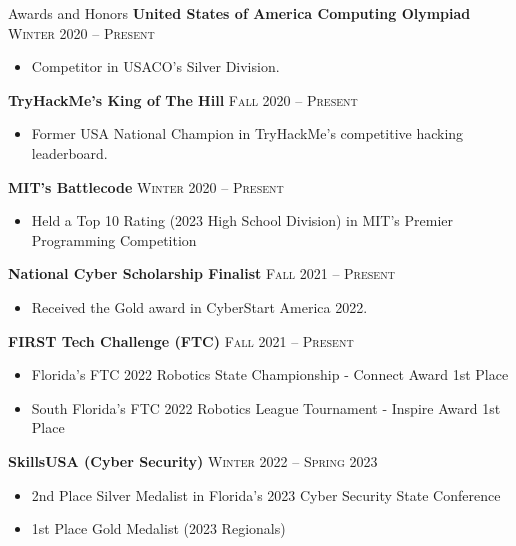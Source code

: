 \begin{resume_section}{Awards and Honors}
	\textbf{United States of America Computing Olympiad} \hspace*{\fill} \textsc{Winter 2020 -- Present}

	\begin{itemize}
		\setlength{\labelsep}{0.1in}
		\item Competitor in USACO’s Silver Division.
	\end{itemize}

	\textbf{TryHackMe's King of The Hill} \hspace*{\fill} \textsc{Fall 2020 -- Present}

	\begin{itemize}
		\setlength{\labelsep}{0.1in}
		\item Former USA National Champion in TryHackMe’s competitive hacking leaderboard.
	\end{itemize}

	\textbf{MIT's Battlecode} \hspace*{\fill} \textsc{Winter 2020 -- Present}

	\begin{itemize}
		\setlength{\labelsep}{0.1in}
		\item Held a Top 10 Rating (2023 High School Division) in MIT’s Premier Programming Competition
	\end{itemize}

	\textbf{National Cyber Scholarship Finalist} \hspace*{\fill} \textsc{Fall 2021 -- Present}

	\begin{itemize}
		\setlength{\labelsep}{0.1in}
		\item Received the Gold award in CyberStart America 2022.
	\end{itemize}

	\textbf{FIRST Tech Challenge (FTC)} \hspace*{\fill} \textsc{Fall 2021 -- Present}

	\begin{itemize}
		\setlength{\labelsep}{0.1in}
		\item Florida’s FTC 2022 Robotics State Championship - Connect Award 1st Place
		\item South Florida’s FTC 2022 Robotics League Tournament - Inspire Award 1st Place
	\end{itemize}

	\textbf{SkillsUSA (Cyber Security)} \hspace*{\fill} \textsc{Winter 2022 -- Spring 2023}

	\begin{itemize}
		\setlength{\labelsep}{0.1in}
		\item 2nd Place Silver Medalist in Florida’s 2023 Cyber Security State Conference
		\item 1st Place Gold Medalist (2023 Regionals)
	\end{itemize}
\end{resume_section}


